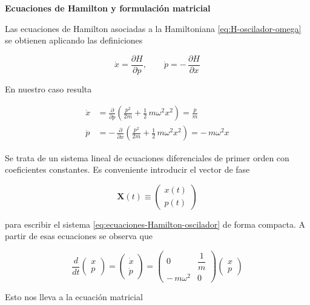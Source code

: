 \documentclass{article}
\begin{document}
\bigskip
\textcolor{trueblue}{\textbf{Ecuaciones de Hamilton y formulación matricial}}

Las ecuaciones de Hamilton asociadas a la Hamiltoniana
\eqref{eq:H-oscilador-omega} se obtienen aplicando las definiciones

\[
\dot{x} = \frac{\partial H}{\partial p},
\qquad
\dot{p} = -\,\frac{\partial H}{\partial x}
\]

En nuestro caso resulta

\begin{equation}
\begin{split}
\dot{x} &= \frac{\partial}{\partial p}
          \left(\frac{p^{2}}{2m} + \frac{1}{2}\,m\omega^{2}x^{2}\right)
        = \frac{p}{m} \\[4pt]
\dot{p} &= -\,\frac{\partial}{\partial x}
          \left(\frac{p^{2}}{2m} + \frac{1}{2}\,m\omega^{2}x^{2}\right)
        = -\,m\omega^{2}x
\end{split}
\label{eq:ecuaciones-Hamilton-oscilador}
\end{equation}

Se trata de un sistema lineal de ecuaciones diferenciales de primer orden con
coeficientes constantes. Es conveniente introducir el vector de fase

\[
\mathbf{X}(t) \equiv
\begin{pmatrix}
x(t) \\[4pt]
p(t)
\end{pmatrix}
\]

para escribir el sistema \eqref{eq:ecuaciones-Hamilton-oscilador} de forma
compacta. A partir de esas ecuaciones se observa que

\[
\frac{d}{dt}
\begin{pmatrix}
x \\[4pt]
p
\end{pmatrix}
=
\begin{pmatrix}
\dot{x} \\[4pt]
\dot{p}
\end{pmatrix}
=
\begin{pmatrix}
0 & \dfrac{1}{m} \\[6pt]
-\,m\omega^{2} & 0
\end{pmatrix}
\begin{pmatrix}
x \\[4pt]
p
\end{pmatrix}
\]

Esto nos lleva a la ecuación matricial
\end{document}
